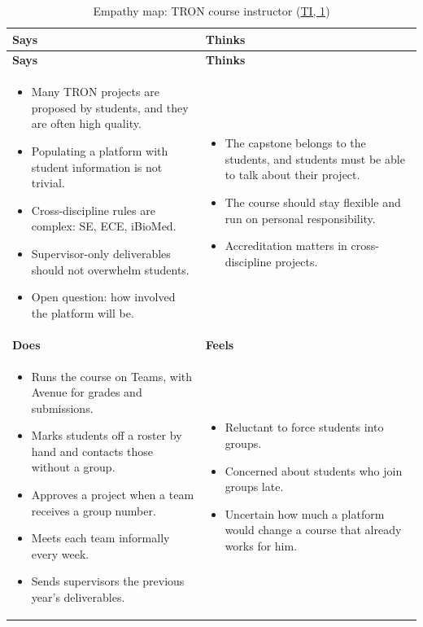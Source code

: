 \documentclass{article}
\newcommand{\intlink}[3]{\hyperref[int:#1-#2]{#3}}
\newcommand{\intref}[2]{\intlink{#1}{#2}{#1, #2}}
\newcommand{\empathymap}[6]{%
    \begin{longtable}{|p{0.465\textwidth}|p{0.465\textwidth}|}
    \caption{#1}\label{#2}\\
    \hline
    \textbf{Says} & \textbf{Thinks}\\ \hline
    \endfirsthead
    \hline
    \textbf{Says} & \textbf{Thinks}\\ \hline
    \endhead
    #3 & #4 \\ \hline
    \textbf{Does} & \textbf{Feels}\\ \hline
    #5 & #6 \\ \hline
    \end{longtable}}
\begin{document}
    \empathymap{Empathy map: TRON course instructor (\intref{TI}{1})}{tab:map-ti}
    {\begin{itemize}
         \item Many TRON projects are proposed by students, and they are often high quality.
         \item Populating a platform with student information is not trivial.
         \item Cross-discipline rules are complex: SE, ECE, iBioMed.
         \item Supervisor-only deliverables should not overwhelm students.
         \item Open question: how involved the platform will be.
    \end{itemize}}
    {\begin{itemize}
         \item The capstone belongs to the students, and students must be able to talk about their project.
         \item The course should stay flexible and run on personal responsibility.
         \item Accreditation matters in cross-discipline projects.
    \end{itemize}}
    {\begin{itemize}
         \item Runs the course on Teams, with Avenue for grades and submissions.
         \item Marks students off a roster by hand and contacts those without a group.
         \item Approves a project when a team receives a group number.
         \item Meets each team informally every week.
         \item Sends supervisors the previous year's deliverables.
    \end{itemize}}
    {\begin{itemize}
         \item Reluctant to force students into groups.
         \item Concerned about students who join groups late.
         \item Uncertain how much a platform would change a course that already works for him.
    \end{itemize}}
\end{document}
